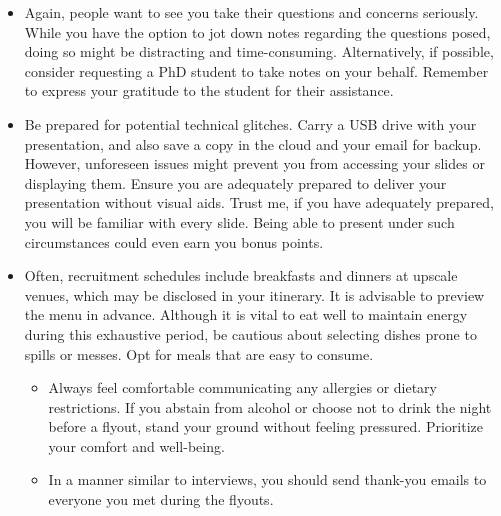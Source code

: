 \documentclass[12pt]{article}
\begin{document}
\begin{itemize}
\begin{itemize}
\end{itemize}
\item Again, people want to see you take their questions and concerns seriously. While you have the option to jot down notes regarding the questions posed, doing so might be distracting and time-consuming. Alternatively, if possible, consider requesting a PhD student to take notes on your behalf. Remember to express your gratitude to the student for their assistance.
\item Be prepared for potential technical glitches. Carry a USB drive with your presentation, and also save a copy in the cloud and your email for backup. However, unforeseen issues might prevent you from accessing your slides or displaying them. Ensure you are adequately prepared to deliver your presentation without visual aids. Trust me, if you have adequately prepared, you will be familiar with every slide. Being able to present under such circumstances could even earn you bonus points.
\item Often, recruitment schedules include breakfasts and dinners at upscale venues, which may be disclosed in your itinerary. It is advisable to preview the menu in advance. Although it is vital to eat well to maintain energy during this exhaustive period, be cautious about selecting dishes prone to spills or messes. Opt for meals that are easy to consume.
\begin{itemize}
\item Always feel comfortable communicating any allergies or dietary restrictions. If you abstain from alcohol or choose not to drink the night before a flyout, stand your ground without feeling pressured. Prioritize your comfort and well-being.
\item In a manner similar to interviews, you should send thank-you emails to everyone you met during the flyouts.
\end{itemize}
\end{itemize}
\end{document}

